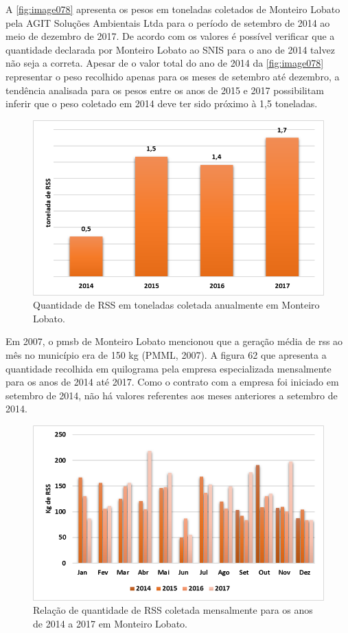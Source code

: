 

A \autoref{fig:image078} apresenta os pesos em toneladas coletados de Monteiro Lobato pela AGIT Soluções Ambientais Ltda para o período de setembro de 2014 ao meio de dezembro de 2017. De acordo com os valores é possível verificar que a quantidade declarada por Monteiro Lobato ao SNIS para o ano de 2014 talvez não seja a correta. Apesar de o valor total do ano de 2014 da \autoref{fig:image078} representar o peso recolhido apenas para os meses de setembro até dezembro, a tendência analisada para os pesos entre os anos de 2015 e 2017 possibilitam inferir que o peso coletado em 2014 deve ter sido próximo à 1,5 toneladas.

\begin{figure}
	\centering
	\includegraphics[width=0.75\linewidth]{produtos/prodtres/image078}
	\caption{Quantidade de RSS em toneladas coletada anualmente em Monteiro Lobato.}
	\label{fig:image078}
\end{figure}


Em 2007, o \gls{pmsb} de Monteiro Lobato mencionou que a geração média de \gls{rss} ao mês no município era de 150 kg (PMML, 2007). A figura 62 que apresenta a quantidade recolhida em quilograma pela empresa especializada mensalmente para os anos de 2014 até 2017. Como o contrato com a empresa foi iniciado em setembro de 2014, não há valores referentes aos meses anteriores a setembro de 2014.


\begin{figure}
	\centering
	\includegraphics[width=0.75\linewidth]{produtos/prodtres/image079}
	\caption{Relação de quantidade de RSS coletada mensalmente para os anos de 2014 a 2017 em Monteiro Lobato.}
	\label{fig:image079}
\end{figure}


